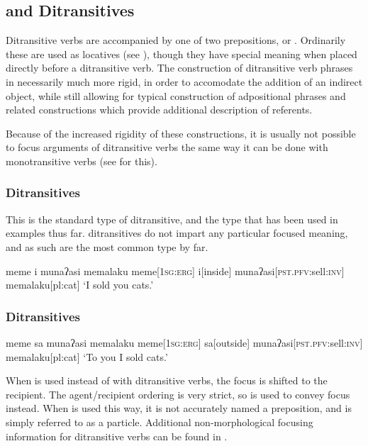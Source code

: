 \subsection{ and  Ditransitives}\label{sec:i_sa_ditrans}
Ditransitive verbs are accompanied by one of two prepositions,  or . Ordinarily these are used as locatives (see ), though they have special meaning when placed directly before a ditransitive verb. The construction of ditransitive verb phrases in necessarily much more rigid, in order to accomodate the addition of an indirect object, while still allowing for typical construction of adpositional phrases and related constructions which provide additional description of referents.

Because of the increased rigidity of these constructions, it is usually not possible to focus arguments of ditransitive verbs the same way it can be done with monotransitive verbs (see  for this).

\subsubsection{ Ditransitives}

This is the standard type of ditransitive, and the type that has been used in examples thus far.  ditransitives do not impart any particular focused meaning, and as such are the most common type by far.

\ex
\begingl
\glpreamble meme i munaʔasi memalaku
\endpreamble
meme[\textsc{1sg:erg}]
i[inside]
munaʔasi[\textsc{pst.pfv:}sell\textsc{:inv}]
memalaku[pl:cat]
\glft `I sold you cats.'
\endgl
\xe

\subsubsection{ Ditransitives}

\ex
\begingl
\glpreamble meme sa munaʔasi memalaku
\endpreamble
meme[\textsc{1sg:erg}]
sa[outside]
munaʔasi[\textsc{pst.pfv:}sell\textsc{:inv}]
memalaku[pl:cat]
\glft `To you I sold cats.'\footnotemark
\endgl
\xe


When  is used instead of  with ditransitive verbs, the focus is shifted to the recipient. The agent/recipient ordering is very strict, so  is used to convey focus instead. When  is used this way, it is not accurately named a preposition, and is simply referred to as a particle. Additional non-morphological focusing information for ditransitive verbs can be found in .

